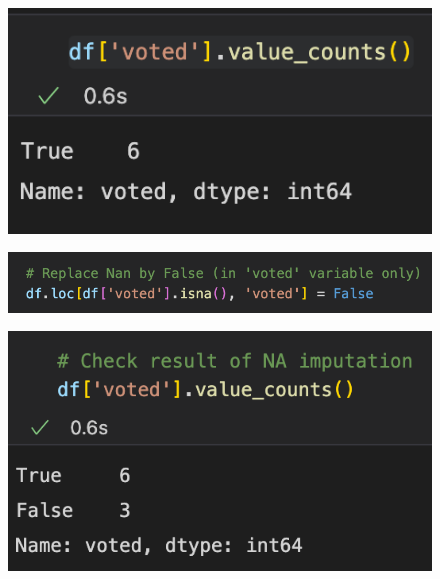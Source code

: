 \begin{frame}
   \begin{minipage}{0.26\linewidth}
      \begin{figure}[H]
         \includegraphics[scale=.35]{../images/illustrations/data_cleaning_na_imputation_info_2.png}
      \end{figure}
   \end{minipage}
      \begin{minipage}{0.45\linewidth}
      \begin{figure}[H]
         \includegraphics[scale=.35]{../images/illustrations/data_cleaning_na_imputation_info_3.png}
      \end{figure}
   \end{minipage}
   \begin{minipage}{0.18\linewidth}
      \begin{figure}[H]
         \includegraphics[scale=.35]{../images/illustrations/data_cleaning_na_imputation_info_4.png}
      \end{figure}
   \end{minipage}
      
\end{frame}



